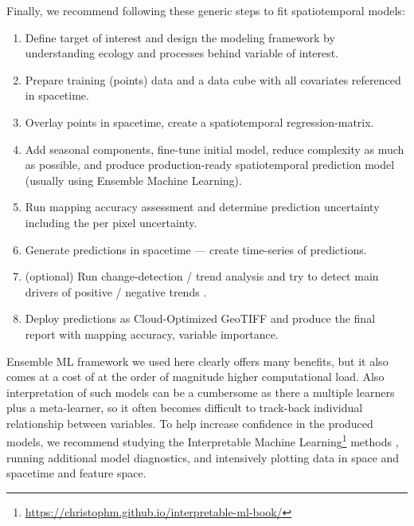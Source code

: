 \documentclass[
  graybox,natbib,nospthms]{svmono}
\providecommand{\tightlist}{%
  \setlength{\itemsep}{0pt}\setlength{\parskip}{0pt}}
\providecommand{\tightlist}{\setlength{\itemsep}{0pt}\setlength{\parskip}{0pt}}
\renewcommand{\href}[2]{#2 (\url{#1})}
\renewcommand{\href}[2]{#2\footnote{\url{#1}}}
\begin{document}
Finally, we recommend following these generic steps to fit spatiotemporal models:

\begin{enumerate}
\def\labelenumi{\arabic{enumi}.}
\setcounter{enumi}{-1}
\tightlist
\item
  Define target of interest and design the modeling framework by understanding
  ecology and processes behind variable of interest.\\
\item
  Prepare training (points) data and a data cube with all covariates
  referenced in spacetime.\\
\item
  Overlay points in spacetime, create a spatiotemporal
  regression-matrix.\\
\item
  Add seasonal components, fine-tune initial model, reduce complexity
  as much as possible, and produce production-ready spatiotemporal prediction model
  (usually using Ensemble Machine Learning).\\
\item
  Run mapping accuracy assessment and determine prediction uncertainty
  including the per pixel uncertainty.\\
\item
  Generate predictions in spacetime --- create time-series of
  predictions.\\
\item
  (optional) Run change-detection / trend analysis and try to detect
  main drivers of positive / negative trends \citep{witjes2021spatiotemporal}.\\
\item
  Deploy predictions as Cloud-Optimized GeoTIFF and produce the final
  report with mapping accuracy, variable importance.
\end{enumerate}

Ensemble ML framework we used here clearly offers many benefits, but it also comes
at a cost of at the order of magnitude higher computational load. Also
interpretation of such models can be a cumbersome as there a multiple
learners plus a meta-learner, so it often becomes difficult to
track-back individual relationship between variables. To help increase
confidence in the produced models, we recommend studying the \href{https://christophm.github.io/interpretable-ml-book/}{Interpretable Machine
Learning} methods
\citep{molnar2020interpretable}, running additional model diagnostics, and
intensively plotting data in space and spacetime and feature space.
\end{document}
